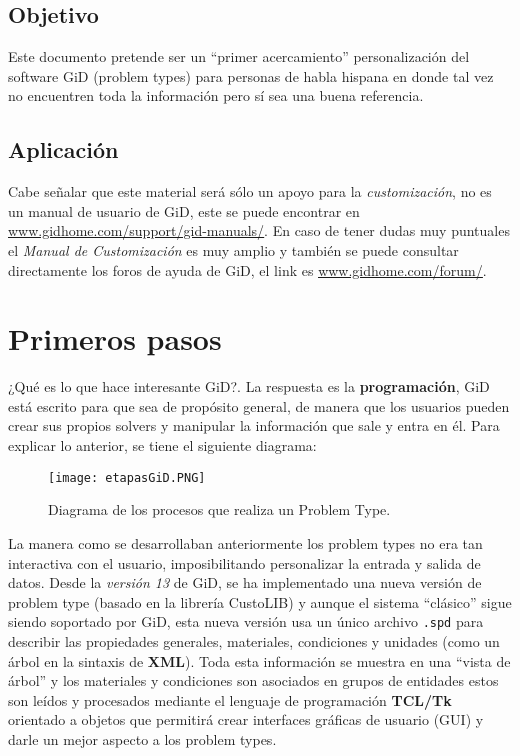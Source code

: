 \documentclass[10pt, a4paper, twocolumn]{article} %
\begin{document}
\subsection{Objetivo}

Este documento pretende ser un ``primer acercamiento'' personalización del software GiD (problem types) para personas de habla hispana en donde tal vez no encuentren toda la información pero sí sea una buena referencia.

\subsection{Aplicación}

Cabe señalar que este material será sólo un apoyo para la \textit{customización}, no es un manual de usuario de GiD, este se puede encontrar en \textcolor{BlueGiD}{\underline{\url{www.gidhome.com/support/gid-manuals/}}}. En caso de tener dudas muy puntuales el \textit{Manual de Customización} es muy amplio y también se puede consultar directamente los foros de ayuda de GiD, el link es \textcolor{BlueGiD}{\underline{\url{www.gidhome.com/forum/}}}.

\section{Primeros pasos} \label{sec:manualTCL}

¿Qué es lo que hace interesante GiD?. La respuesta es la \textbf{programación}, GiD está escrito para que sea de propósito general, de manera que los usuarios pueden crear sus propios solvers y manipular la información que sale y entra en él. Para explicar lo anterior, se tiene el siguiente diagrama:

\begin{figure}[hbtp!]
	\centering
	\texttt{[image: etapasGiD.PNG]}
	\caption{Diagrama de los procesos que realiza un Problem Type.\label{fig:diagramaProcesos}}
\end{figure}

La manera como se desarrollaban anteriormente los problem types no era tan interactiva con el usuario, imposibilitando personalizar la entrada y salida de datos. Desde la \textit{versión 13} de GiD, se ha implementado una nueva versión de problem type (basado en la librería CustoLIB) y aunque el sistema ``clásico'' sigue siendo soportado por GiD, esta nueva versión usa un único archivo \texttt{.spd} para describir las propiedades generales, materiales, condiciones y unidades (como un árbol en la sintaxis de \textbf{XML}). Toda esta información se muestra en una ``vista de árbol'' y los materiales y condiciones son asociados en grupos de entidades estos son leídos y procesados mediante el lenguaje de programación \textbf{TCL/Tk} orientado a objetos que permitirá crear interfaces gráficas de usuario (GUI) y darle un mejor aspecto a los problem types.
\end{document}

